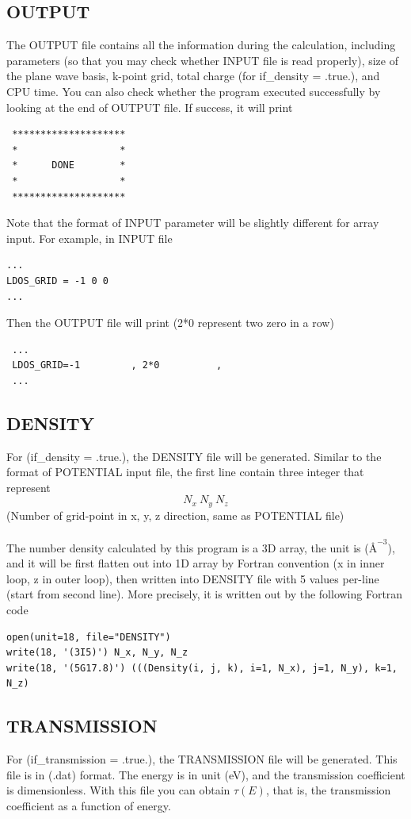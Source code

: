 \documentclass[10pt]{article}
\begin{document}
\subsection{OUTPUT}
The OUTPUT file contains all the information during the calculation, including parameters (so that you may check whether INPUT file is read properly), size of the plane wave basis, k-point grid, total charge (for if{\_}density = .true.), and CPU time. You can also check whether the program executed successfully by looking at the end of OUTPUT file. If success, it will print
\begin{lstlisting}
 ********************
 *                  *
 *      DONE        *
 *                  *
 ********************
\end{lstlisting}
\vspace{1em}
Note that the format of INPUT parameter will be slightly different for array input. For example, in INPUT file
\begin{lstlisting}
...
LDOS_GRID = -1 0 0
...
\end{lstlisting}
Then the OUTPUT file will print (2*0 represent two zero in a row)
\begin{lstlisting}
 ...
 LDOS_GRID=-1         , 2*0          ,
 ...
\end{lstlisting}

\subsection{DENSITY}
For (if{\_}density = .true.), the DENSITY file will be generated. Similar to the format of POTENTIAL input file, the first line contain three integer that represent
\[N_x\ N_y\ N_z\]
(Number of grid-point in x, y, z direction, same as POTENTIAL file)\\\\
The number density calculated by this program is a 3D array, the unit is ($\text{\AA}^{-3}$), and it will be first flatten out into 1D array by Fortran convention (x in inner loop, z in outer loop), then written into DENSITY file with 5 values per-line (start from second line). More precisely, it is written out by the following Fortran code
\begin{lstlisting}
open(unit=18, file="DENSITY")
write(18, '(3I5)') N_x, N_y, N_z
write(18, '(5G17.8)') (((Density(i, j, k), i=1, N_x), j=1, N_y), k=1, N_z)
\end{lstlisting}

\subsection{TRANSMISSION}
For (if{\_}transmission = .true.), the TRANSMISSION file will be generated. This file is in (.dat) format. The energy is in unit (eV), and the transmission coefficient is dimensionless. With this file you can obtain $\tau (E)$, that is, the transmission coefficient as a function of energy.
\end{document}
